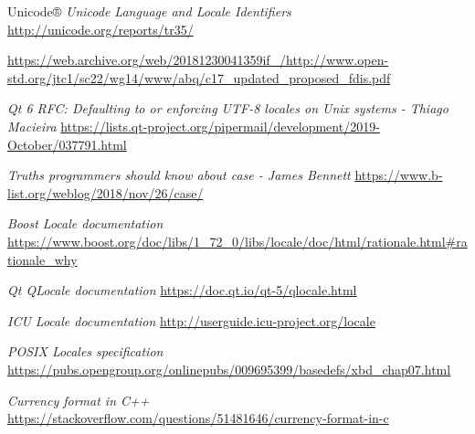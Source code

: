 \documentclass{wg21}
\begin{document}
\renewcommand{\section}[2]{}%
\begin{thebibliography}{9}
    \nocite{N4830}
    
    Unicode®
    \emph{Unicode Language and Locale Identifiers}\newline
    \url{http://unicode.org/reports/tr35/}

    \url{https://web.archive.org/web/20181230041359if_/http://www.open-std.org/jtc1/sc22/wg14/www/abq/c17_updated_proposed_fdis.pdf}  
       
    \emph{Qt 6 RFC: Defaulting to or enforcing UTF-8 locales on Unix systems - Thiago Macieira }\newline
    \url{https://lists.qt-project.org/pipermail/development/2019-October/037791.html}    
    
    
    \emph{Truths programmers should know about case -  James Bennett}\newline
    \url{https://www.b-list.org/weblog/2018/nov/26/case/}
    
    \emph{Boost Locale documentation}\newline
    \url{https://www.boost.org/doc/libs/1_72_0/libs/locale/doc/html/rationale.html#rationale_why}
    
    \emph{Qt QLocale documentation}\newline
    \url{https://doc.qt.io/qt-5/qlocale.html} 
    
    
    \emph{ICU Locale documentation}\newline
    \url{http://userguide.icu-project.org/locale} 
    
    \emph{POSIX Locales specification}\newline
    \url{https://pubs.opengroup.org/onlinepubs/009695399/basedefs/xbd_chap07.html}
    
    
    \emph{Currency format in C++}\newline
    \url{https://stackoverflow.com/questions/51481646/currency-format-in-c}        
     
\end{thebibliography}
\end{document}
